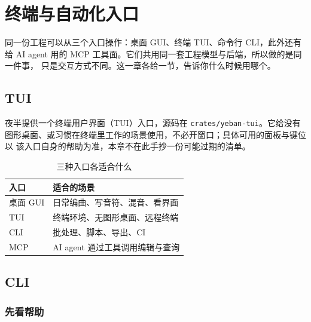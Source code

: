
\chapter{终端与自动化入口}
\label{ch:entry-points}






同一份工程可以从三个入口操作：桌面 GUI、终端 TUI、命令行 CLI，此外还有给
AI agent 用的 MCP 工具面。它们共用同一套工程模型与后端，所以做的是同一件事，
只是交互方式不同。这一章各给一节，告诉你什么时候用哪个。

\section{TUI}

夜半提供一个终端用户界面（TUI）入口，源码在 \texttt{crates/yeban-tui}。它给没有
图形桌面、或习惯在终端里工作的场景使用，不必开窗口；具体可用的面板与键位以
该入口自身的帮助为准，本章不在此手抄一份可能过期的清单。

\begin{table}[htbp]
\centering
\caption{三种入口各适合什么}
\label{tab:ch10-entry-compare}
\begin{tabular}{ll}
\hline
入口 & 适合的场景 \\
\hline
桌面 GUI & 日常编曲、写音符、混音、看界面 \\
TUI & 终端环境、无图形桌面、远程终端 \\
CLI & 批处理、脚本、导出、CI \\
MCP & AI agent 通过工具调用编辑与查询 \\
\hline
\end{tabular}
\end{table}

\section{CLI}

\subsection{先看帮助}

